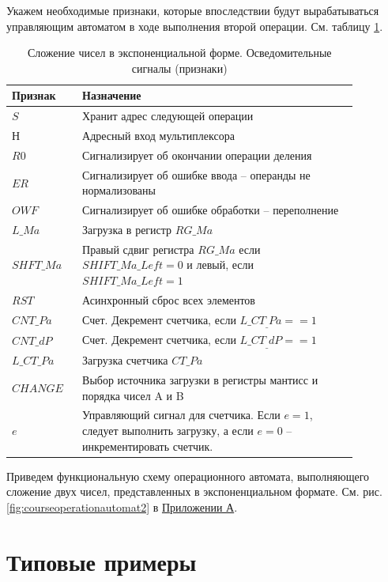 \documentclass[a4paper,14pt]{extarticle}
\begin{document}
Укажем необходимые признаки, которые впоследствии будут вырабатываться управляющим автоматом в ходе выполнения второй операции. См. таблицу \ref{tab:signalsop2}.

\begin{table}[h!]
	\centering
	\small
	\begin{tabular}{|m{0.17\linewidth}|m{0.7\linewidth}|}
		\hline
		\textbf{Признак} & \textbf{Назначение} \\ \hline
		$S$ & Хранит адрес следующей операции \\ \hline
		$Н$ & Адресный вход мультиплексора \\ \hline
		$R0$ & Сигнализирует об окончании операции деления \\ \hline
		$ER$ & Сигнализирует об ошибке ввода -- операнды не нормализованы \\ \hline
		$OWF$ & Сигнализирует об ошибке обработки -- переполнение \\ \hline
		$L\_Ma$ & Загрузка в регистр $RG\_Ma$ \\ \hline
		$SHFT\_Ma$ & Правый сдвиг регистра $RG\_Ma$ если $SHIFT\_Ma\_Left=0$ и левый, если  $SHIFT\_Ma\_Left=1$ \\ \hline
		$RST$ & Асинхронный сброс всех элементов \\ \hline
		$CNT\_Pa$ & Счет. Декремент счетчика, если $L\_CT_\_Pa==1$ \\ \hline
		$CNT\_dP$ & Счет. Декремент счетчика, если $L\_CT_\_dP==1$ \\ \hline
		$L\_CT\_Pa$ & Загрузка счетчика $CT\_Pa$ \\ \hline
		$CHANGE$ & Выбор источника загрузки в регистры мантисс и порядка чисел A и B \\ \hline
		$e$ & Управляющий сигнал для счетчика. Если $e=1$, следует выполнить загрузку, а если $e=0$ -- инкрементировать счетчик. \\ \hline
	\end{tabular}
	\caption{Сложение чисел в экспоненциальной форме. Осведомительные сигналы (признаки)}
	\label{tab:signalsop2}
\end{table}



Приведем функциональную схему операционного автомата, выполняющего сложение двух чисел, представленных в экспоненциальном формате. См. рис. \ref{fig:courseoperationautomat2} в \hyperref[tam]{Приложении А}.



\newpage
\section{Типовые примеры}
\end{document}
